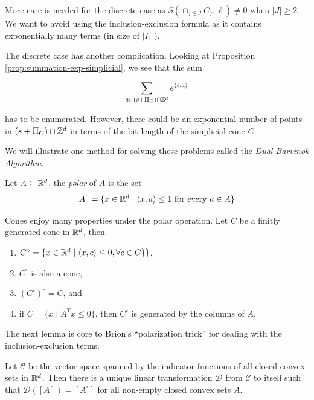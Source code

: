 More care is needed for the discrete case as $S(\cap_{j \in J} C_j, \ell) \neq 0$ when $|J| \geq 2$. We want to avoid using the inclusion-exclusion formula as it contains exponentially many terms (in size of $|I_1|$). 

The discrete case has another complication. Looking at Proposition \ref{prop:summation-exp-simplicial}, we see that the sum 

\[ \sum_{a \in (s+\Pi_C) \cap {\mathbb Z}^d} e^{{\langle} \ell, a {\rangle}}\]

has to be enumerated. However, there could be an exponential number of points in $(s+\Pi_C) \cap {\mathbb Z}^d$ in terms of the bit length of the simplicial cone $C$. 

We will illustrate one method for solving these problems called the \emph{Dual Barvinok Algorithm}.


\begin{definition}
Let $A \subseteq {\mathbb R}^d$, the \emph{polar} of $A$ is the set 
\[ A^\circ = \{ x \in {\mathbb R}^d \mid  {\langle} x, a {\rangle} \leq 1 \text{ for every } a \in A \}  \]
\end{definition}

\begin{lemma}
Cones enjoy many properties under the polar operation. Let $C$ be a finitly generated cone in ${\mathbb R}^d$, then

\begin{enumerate}
\item $C^\circ = \{ x \in {\mathbb R}^d \mid {\langle} x, c {\rangle} \leq 0, \forall c \in C \} \}$, 
\item $C^\circ$ is also a cone,
\item $(C^\circ)^\circ = C$, and
\item if $C = \{ x \mid A^Tx \leq 0 \}$, then $C^\circ$ is generated by the columns of $A$.
\end{enumerate}
\end{lemma}

The next lemma is core to  Brion's ``polarization trick'' \cite{Brion88} for dealing with the inclusion-exclusion terms.

\begin{lemma}
Let $\mathcal{C}$ be the vector space spanned by the indicator functions of all closed convex sets in ${\mathbb R}^d$. Then there is a unique linear transformation  $\mathcal{D}$ from $\mathcal{C}$ to itself such that $\mathcal{D}([A]) = [A^\circ]$ for all non-empty closed convex sets $A$.
\end{lemma}


